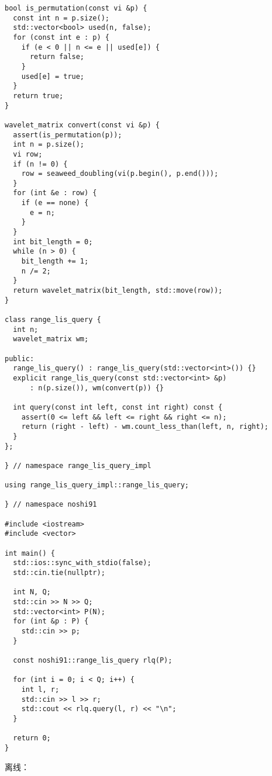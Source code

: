 \documentclass[12pt]{ctexart}
\begin{document}
\begin{lstlisting}
bool is_permutation(const vi &p) {
  const int n = p.size();
  std::vector<bool> used(n, false);
  for (const int e : p) {
    if (e < 0 || n <= e || used[e]) {
      return false;
    }
    used[e] = true;
  }
  return true;
}

wavelet_matrix convert(const vi &p) {
  assert(is_permutation(p));
  int n = p.size();
  vi row;
  if (n != 0) {
    row = seaweed_doubling(vi(p.begin(), p.end()));
  }
  for (int &e : row) {
    if (e == none) {
      e = n;
    }
  }
  int bit_length = 0;
  while (n > 0) {
    bit_length += 1;
    n /= 2;
  }
  return wavelet_matrix(bit_length, std::move(row));
}

class range_lis_query {
  int n;
  wavelet_matrix wm;

public:
  range_lis_query() : range_lis_query(std::vector<int>()) {}
  explicit range_lis_query(const std::vector<int> &p)
      : n(p.size()), wm(convert(p)) {}

  int query(const int left, const int right) const {
    assert(0 <= left && left <= right && right <= n);
    return (right - left) - wm.count_less_than(left, n, right);
  }
};

} // namespace range_lis_query_impl

using range_lis_query_impl::range_lis_query;

} // namespace noshi91

#include <iostream>
#include <vector>

int main() {
  std::ios::sync_with_stdio(false);
  std::cin.tie(nullptr);

  int N, Q;
  std::cin >> N >> Q;
  std::vector<int> P(N);
  for (int &p : P) {
    std::cin >> p;
  }

  const noshi91::range_lis_query rlq(P);

  for (int i = 0; i < Q; i++) {
    int l, r;
    std::cin >> l >> r;
    std::cout << rlq.query(l, r) << "\n";
  }

  return 0;
}
\end{lstlisting}


离线：
\end{document}
